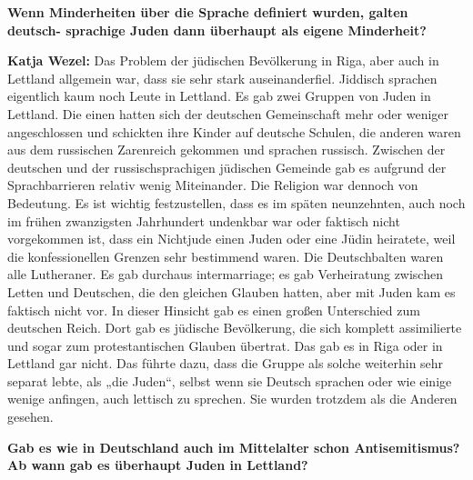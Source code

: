 \textbf{Wenn Minderheiten über die Sprache definiert wurden, galten deutsch- sprachige Juden dann überhaupt als eigene Minderheit?} 

\textbf{Katja Wezel:} Das Problem der jüdischen Bevölkerung in Riga, aber auch in Lettland allgemein war, dass sie sehr stark auseinanderfiel. Jiddisch sprachen eigentlich kaum noch Leute in Lettland. Es gab zwei Gruppen von Juden in Lettland. Die einen hatten sich der deutschen Gemeinschaft mehr oder weniger angeschlossen und schickten ihre Kinder auf deutsche Schulen, die anderen waren aus dem russischen Zarenreich gekommen und sprachen russisch. Zwischen der deutschen und der russischsprachigen jüdischen Gemeinde gab es aufgrund der Sprachbarrieren relativ wenig Miteinander. 
Die Religion war dennoch von Bedeutung. Es ist wichtig festzustellen, dass es im späten neunzehnten, auch noch im frühen zwanzigsten Jahrhundert undenkbar war oder faktisch nicht vorgekommen ist, dass ein Nichtjude einen Juden oder eine Jüdin heiratete, weil die konfessionellen Grenzen sehr bestimmend waren. Die Deutschbalten waren alle Lutheraner. Es gab durchaus intermarriage; es gab Verheiratung zwischen Letten und Deutschen, die den gleichen Glauben hatten, aber mit Juden kam es faktisch nicht vor. In dieser Hinsicht gab es einen großen Unterschied zum deutschen Reich. Dort gab es jüdische Bevölkerung, die sich komplett assimilierte und sogar zum protestantischen Glauben übertrat. Das gab es in Riga oder in Lettland gar nicht. Das führte dazu, dass die Gruppe als solche weiterhin sehr separat lebte, als „die Juden“, selbst wenn sie Deutsch sprachen oder wie einige wenige anfingen, auch lettisch zu sprechen. Sie wurden trotzdem als die Anderen gesehen. 

\textbf{Gab es wie in Deutschland auch im Mittelalter schon Antisemitismus? Ab wann gab es überhaupt Juden in Lettland?}


